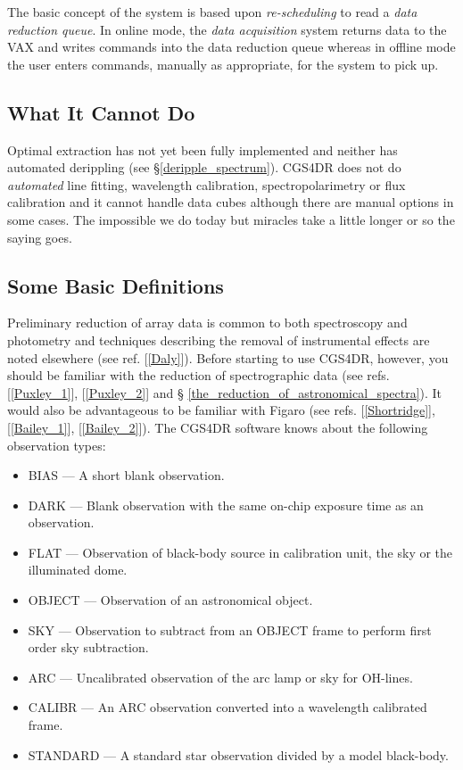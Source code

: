 {The basic concept of the system is based upon {\em re-scheduling} to read a 
{\em data reduction queue}. In online mode, the {\em data acquisition} 
system returns data to the VAX and writes commands into the data reduction 
queue whereas in offline mode the user enters commands, manually as 
appropriate, for the system to pick up. 

\subsection{What It Cannot Do}
\label{what_it_cannot_do}

Optimal extraction has not yet been fully implemented and neither has automated 
derippling (see \S \ref{deripple_spectrum}). CGS4DR does not do {\em automated}
line fitting, wavelength calibration, spectropolarimetry or flux calibration 
and it cannot handle data cubes although there are manual options in some 
cases. The impossible we do today but miracles take a little longer or so the 
saying goes.  

\subsection{Some Basic Definitions}
\label{some_basic_definitions}

Preliminary reduction of array data is common to both spectroscopy and 
photometry and techniques describing the removal of instrumental effects 
are noted elsewhere (see ref. [\ref{Daly}]). Before starting to use CGS4DR, 
however, you should be familiar with the reduction of spectrographic data 
(see refs. [\ref{Puxley_1}], [\ref{Puxley_2}] and \S 
\ref{the_reduction_of_astronomical_spectra}). 
It would also be advantageous to be familiar with Figaro (see refs. 
[\ref{Shortridge}], [\ref{Bailey_1}], [\ref{Bailey_2}]). The CGS4DR software 
knows about the following observation types:

\begin{itemize}
\item {\sf BIAS} --- A short blank observation.
\item {\sf DARK} --- Blank observation with the same on-chip exposure time as 
 an observation.
\item {\sf FLAT} --- Observation of black-body source in calibration unit, 
 the sky or the illuminated dome.
\item {\sf OBJECT} --- Observation of an astronomical object.
\item {\sf SKY} --- Observation to subtract from an {\sf OBJECT} frame to 
 perform first order sky subtraction. 
\item {\sf ARC} --- Uncalibrated observation of the arc lamp or sky for 
 OH-lines.
\item {\sf CALIBR} --- An {\sf ARC} observation converted into a wavelength 
 calibrated frame.
\item {\sf STANDARD} --- A standard star observation divided by a model 
 black-body.
\end{itemize}

}
